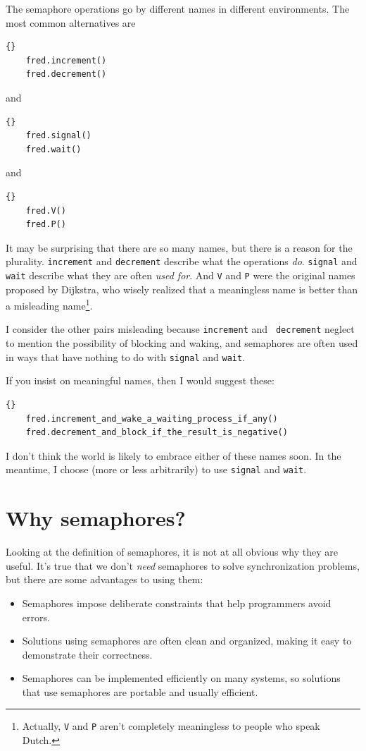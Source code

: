 \documentclass{book}
\begin{document}
The semaphore operations go by different names in different environments.
The most common alternatives are 
%
\begin{lstlisting}[caption={Semaphore operations}]{}
    fred.increment()
    fred.decrement()	
\end{lstlisting}
%
and
%
\begin{lstlisting}[caption={Semaphore operations}]{}
    fred.signal()
    fred.wait()	
\end{lstlisting}
%
and
%
\begin{lstlisting}[caption={Semaphore operations}]{}
    fred.V()
    fred.P()	
\end{lstlisting}
%
It may be surprising that there are so many names, but there is a
reason for the plurality.  {\tt increment} and {\tt decrement}
describe what the operations {\em do}.  {\tt signal} and {\tt wait}
describe what they are often {\em used for}.  And {\tt V} and {\tt P} were
the original names proposed by Dijkstra, who wisely realized that a
meaningless name is better than a misleading name\footnote{Actually,
{\tt V} and {\tt P} aren't completely meaningless to people who speak
Dutch.}.

I consider the other pairs misleading because {\tt increment} and {\tt
decrement} neglect to mention the possibility of blocking and waking,
and semaphores are often used in ways that have nothing to do with
{\tt signal} and {\tt wait}.

If you insist on meaningful names, then I would suggest these:

\begin{lstlisting}[caption={Semaphore operations}]{}
    fred.increment_and_wake_a_waiting_process_if_any()
    fred.decrement_and_block_if_the_result_is_negative()	
\end{lstlisting}

I don't think the world is likely to embrace either of these names
soon.  In the meantime, I choose (more or less arbitrarily) to use
{\tt signal} and {\tt wait}.


\section{Why semaphores?}

Looking at the definition of semaphores, it is not at all obvious why
they are useful.  It's true that we don't {\em need} semaphores to
solve synchronization problems, but there are some advantages to using
them:

\begin{itemize}

\item Semaphores impose deliberate constraints that help
programmers avoid errors.

\item Solutions using semaphores are often clean and organized,
making it easy to demonstrate their correctness.

\item Semaphores can be implemented efficiently on many systems,
so solutions that use semaphores are portable and usually
efficient.

\end{itemize}
\end{document}
